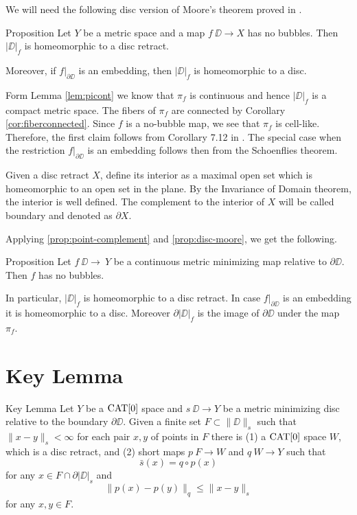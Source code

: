 \documentclass{article}
\begin{document}
We will need the following disc version of Moore's theorem \cite{moore} proved in \cite{LW3}.

\begin{thm}{Proposition}\label{prop:disc-moore}
Let $Y$ be a metric space and a map $f\:\DD\to X$ has no bubbles.
Then $|\DD|_f$ is homeomorphic to a disc retract.

Moreover, if $f|_{\partial\DD}$ is an embedding, then $|\DD|_f$ is homeomorphic to a disc.
\end{thm}


Form Lemma \ref{lem:picont} we know that $\pi_f$ is continuous and hence $|\DD|_f$
is a compact metric space. 
The fibers of $\pi_f$ are connected by Corollary \ref{cor:fiberconnected}.
Since $f$ is a no-bubble map, we see that $\pi_f$ is cell-like. 
Therefore, the first claim follows from 
Corollary 7.12 in \cite{LW3}.
The special case when the restriction $f|_{\partial\DD}$ is an embedding follows then from the Schoenflies theorem.
\qeds

Given a disc retract $X$,
define its interior as a maximal open set which is homeomorphic to an open set in the plane.
By the Invariance of Domain theorem, the interior is well defined.
The complement to the interior of $X$ will be called boundary and denoted as $\partial X$.

Applying \ref{prop:point-complement} and \ref{prop:disc-moore}, we get the following.

\begin{thm}{Proposition}\label{prop:|D|}
Let $f\:\DD\to\ Y$ be a continuous metric minimizing map relative to $\partial \DD$.
Then $f$ has no bubbles.

In particular,  $|\DD|_f$ is homeomorphic to a disc retract. 
In case $f|_{\partial\DD}$ is an
embedding it is homeomorphic to a disc.
Moreover $\partial|\DD|_f$ is the image of $\partial \DD$
under the map $\pi_f$.
\end{thm}











\section{Key Lemma}\label{Key Lemma}


\begin{thm}{Key Lemma}\label{lem:key}
Let $Y$ be a $\mathop{\rm CAT}\nolimits[0]$ space and $s\:\DD\to Y$ 
be a metric minimizing disc relative to the boundary $\partial \DD$.
Given a finite set $F\subset \|\DD\|_s$ such that $\|x-y\|_s<\infty$ for each pair $x,y$ of points in $F$
there is 
(1) a $\mathop{\rm CAT}\nolimits[0]$ space $W$, which is a disc retract,
and (2) short maps $p\:F\to W$ and $q\:W\to Y$ such that
\[\bar s(x)=q\circ p(x)\] 
for any $x\in F\cap \partial |\DD|_s$
and 
\[\|p(x)-p(y)\|_q\le \|x-y\|_s\] 
for any $x,y\in F$.
\end{thm}
\end{document}

